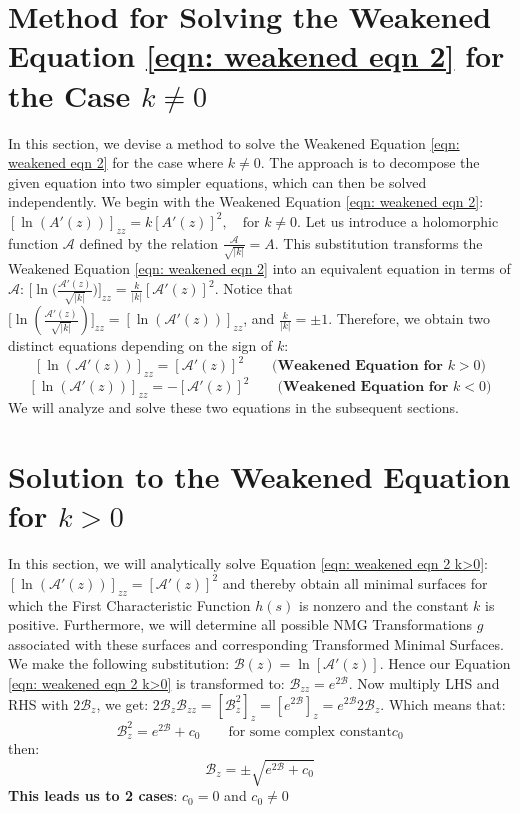 \documentclass[12pt]{article}
\theoremstyle{plain}
\theoremstyle{definition}
\theoremstyle{remark}
\begin{document}
\section{Method for Solving the Weakened Equation \ref{eqn: weakened eqn 2} for the Case \(k \neq 0\)}
In this section, we devise a method to solve the Weakened Equation \ref{eqn: weakened eqn 2} for the case where \(k \neq 0\). The approach is to decompose the given equation into two simpler equations, which can then be solved independently. We begin with the Weakened Equation \ref{eqn: weakened eqn 2}: \([\ln(A'(z))]_{zz} = k [A'(z)]^2, \quad \text{for } k \neq 0.\) Let us introduce a holomorphic function \(\mathcal{A}\) defined by the relation \(\frac{\mathcal{A}}{\sqrt{|k|}} = A.\) This substitution transforms the Weakened Equation \ref{eqn: weakened eqn 2} into an equivalent equation in terms of \(\mathcal{A}\): \(\big[\ln\big(\tfrac{\mathcal{A}'(z)}{\sqrt{|k|}}\big)\big]_{zz} 
= \frac{k}{|k|} [\mathcal{A}'(z)]^2\). Notice that \(\big[\ln(\tfrac{\mathcal{A}'(z)}{\sqrt{|k|}})\big]_{zz} = [\ln(\mathcal{A}'(z))]_{zz}\), and \(\tfrac{k}{|k|} = \pm 1\). Therefore, we obtain two distinct equations depending on the sign of \(k\):
\begin{equation}
	\label{eqn: weakened eqn 2 k>0}
	[\ln(\mathcal{A}'(z))]_{zz} = [\mathcal{A}'(z)]^2 
	\qquad \textbf{(Weakened Equation for } k > 0\textbf{)}
\end{equation}
\begin{equation}
	\label{eqn: weakened eqn 2 k<0}
	[\ln(\mathcal{A}'(z))]_{zz} = -[\mathcal{A}'(z)]^2 
	\qquad \textbf{(Weakened Equation for } k < 0\textbf{)}
\end{equation}
We will analyze and solve these two equations in the subsequent sections.


\section{Solution to the Weakened Equation for \(k>0\)}
In this section, we will analytically solve Equation \ref{eqn: weakened eqn 2 k>0}: \([\ln(\mathcal{A}'(z))]_{zz} = [\mathcal{A}'(z)]^2 \) and thereby obtain all minimal surfaces for which the First Characteristic Function $h(s)$ is nonzero and the constant $k$ is positive. Furthermore, we will determine all possible NMG Transformations $g$ associated with these surfaces and corresponding Transformed Minimal Surfaces. We make the following substitution: $\mathcal{B}(z)=\ln[\mathcal{A}'(z)]$. Hence our Equation \ref{eqn: weakened eqn 2 k>0} is transformed to: \(\mathcal{B}_{zz}=e^{2\mathcal{B}}\). Now multiply LHS and RHS with $2\mathcal{B}_z$, we get: \(2\mathcal{B}_z\mathcal{B}_{zz}=[\mathcal{B}_z^2]_z=[e^{2\mathcal{B}}]_z=e^{2\mathcal{B}}2\mathcal{B}_z\). Which means that:
\[
  \mathcal{B}_z^2=e^{2\mathcal{B}}+c_0 \qquad\text{for some complex constant} c_0
\]
then:
\[
  \mathcal{B}_z=\pm \sqrt{e^{2\mathcal{B}}+c_0}
\]
\textbf{This leads us to 2 cases}: $c_0=0$ and $c_0\neq0$
\end{document}
